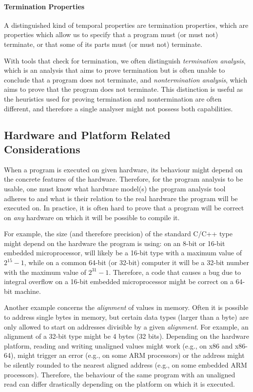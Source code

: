 \paragraph{Termination Properties}
%
A distinguished kind of temporal properties are termination properties, which are properties which allow us to specify that a program must (or must not) terminate, or that some of its parts must (or must not) terminate.

With tools that check for termination, we often distinguish \emph{termination analysis}, which is an analysis that aims to prove termination but is often unable to conclude that a program does not terminate, and \emph{nontermination analysis}, which aims to prove that the program does not terminate.
This distinction is useful as the heuristics used for proving termination and nontermination are often different, and therefore a single analyser might not possess both capabilities.

\subsection{Hardware and Platform Related Considerations}

When a program is executed on given hardware, its behaviour might
depend on the concrete features of the hardware.
Therefore, for the program analysis to be usable, one must know what
hardware model(s) the program analysis tool adheres to and what is their
relation to the real hardware the program will be executed on.
In practice, it is often hard to prove that a program will be correct on
\emph{any} hardware on which it will be possible to compile it.

For example, the size (and therefore precision) of the standard C/C++ type
 might depend on the hardware the program is using: on an 8-bit or
16-bit embedded microprocessor,  will likely be a 16-bit type with a
maximum value of $2^{15} - 1$, while on a common 64-bit (or 32-bit) computer it
will be a 32-bit number with the maximum value of $2^{31}-1$.
Therefore, a code that causes a bug due to integral overflow on a 16-bit
embedded microprocessor might be correct on a 64-bit machine.

Another example concerns the \emph{alignment} of values in memory.
Often it is
possible to address single bytes in memory, but certain data types (larger
than a byte) are only allowed to start on addresses divisible by a given
\emph{alignment}.
For example, an alignment of a 32-bit  type might be 4 bytes (32
bits).
Depending on the hardware platform, reading and writing unaligned values might
work (e.g., on x86 and x86-64), might trigger an error (e.g., on some ARM
processors) or the address might be silently rounded to the nearest
aligned address (e.g., on some embedded ARM processors).
Therefore, the behaviour of the same program with an unaligned read can differ
drastically depending on the platform on which it is executed.

